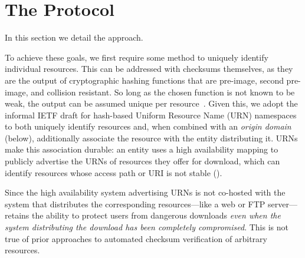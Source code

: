 \section{The \SYSTEM{} Protocol} \label{sec:approach}




In this section we detail the \SYSTEM{} approach.

To achieve these goals, we first require some method to uniquely identify
individual resources. This can be addressed with checksums themselves, as they
are the output of cryptographic hashing functions that are pre-image, second
pre-image, and collision resistant. So long as the chosen function is not known
to be weak, the output can be assumed unique per resource~\cite{Rogaway}. Given
this, we adopt the informal IETF draft for hash-based Uniform Resource Name
(URN) namespaces~\cite{draft-URN} to both uniquely identify resources and, when
combined with an \emph{origin domain} (below), additionally associate the
resource with the entity distributing it. URNs make this association durable: an
entity uses a high availability mapping to publicly advertise the URNs of
resources they offer for download, which can identify resources whose access
path or URI is not stable ().

Since the high availability system advertising URNs is not co-hosted with the
system that distributes the corresponding resources---like a web or FTP
server---\SYSTEM{} retains the ability to protect users from dangerous downloads
\emph{even when the system distributing the download has been completely
compromised}. This is not true of prior approaches to automated checksum
verification of arbitrary resources. 

